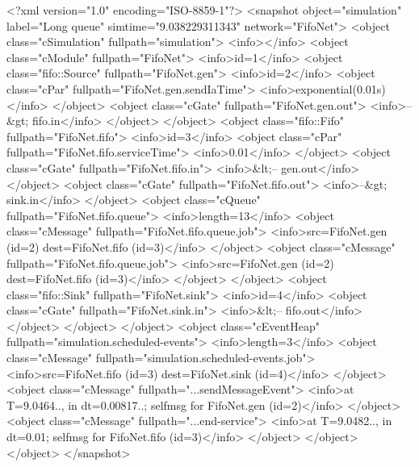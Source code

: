 \begin{filelisting}
<?xml version="1.0" encoding="ISO-8859-1"?>
<snapshot object="simulation" label="Long queue" simtime="9.038229311343"
network="FifoNet">
  <object class="cSimulation" fullpath="simulation">
    <info></info>
    <object class="cModule" fullpath="FifoNet">
      <info>id=1</info>
      <object class="fifo::Source" fullpath="FifoNet.gen">
        <info>id=2</info>
        <object class="cPar" fullpath="FifoNet.gen.sendIaTime">
          <info>exponential(0.01s)</info>
        </object>
        <object class="cGate" fullpath="FifoNet.gen.out">
          <info>--&gt; fifo.in</info>
        </object>
      </object>
      <object class="fifo::Fifo" fullpath="FifoNet.fifo">
        <info>id=3</info>
        <object class="cPar" fullpath="FifoNet.fifo.serviceTime">
          <info>0.01</info>
        </object>
        <object class="cGate" fullpath="FifoNet.fifo.in">
          <info>&lt;-- gen.out</info>
        </object>
        <object class="cGate" fullpath="FifoNet.fifo.out">
          <info>--&gt; sink.in</info>
        </object>
        <object class="cQueue" fullpath="FifoNet.fifo.queue">
          <info>length=13</info>
          <object class="cMessage" fullpath="FifoNet.fifo.queue.job">
            <info>src=FifoNet.gen (id=2)  dest=FifoNet.fifo (id=3)</info>
          </object>
          <object class="cMessage" fullpath="FifoNet.fifo.queue.job">
            <info>src=FifoNet.gen (id=2)  dest=FifoNet.fifo (id=3)</info>
          </object>
        </object>
      <object class="fifo::Sink" fullpath="FifoNet.sink">
        <info>id=4</info>
        <object class="cGate" fullpath="FifoNet.sink.in">
          <info>&lt;-- fifo.out</info>
        </object>
      </object>
    </object>
    <object class="cEventHeap" fullpath="simulation.scheduled-events">
      <info>length=3</info>
      <object class="cMessage" fullpath="simulation.scheduled-events.job">
        <info>src=FifoNet.fifo (id=3)  dest=FifoNet.sink (id=4)</info>
      </object>
      <object class="cMessage" fullpath="...sendMessageEvent">
        <info>at T=9.0464.., in dt=0.00817..; selfmsg for FifoNet.gen (id=2)</info>
      </object>
      <object class="cMessage" fullpath="...end-service">
        <info>at T=9.0482.., in dt=0.01; selfmsg for FifoNet.fifo (id=3)</info>
      </object>
    </object>
  </object>
</snapshot>

\end{filelisting}



